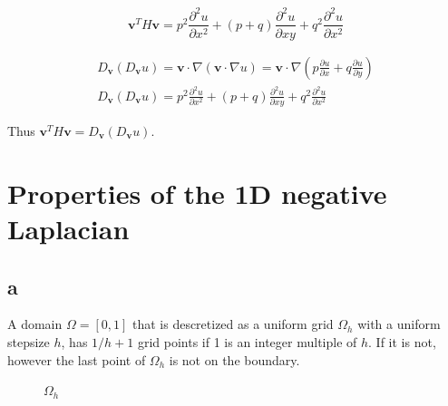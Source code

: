 \documentclass{article}
\begin{document}
\begin{equation*}
\mathbf{v}^{T} H \mathbf{v}= p^2\frac{\partial^2 u}{\partial x^2}+(p+q)\frac{\partial^2 u}{\partial xy} +q^2\frac{\partial^2 u}{\partial x^2}
\end{equation*}

\begin{align*}
D_{\mathbf{v}}\left(D_{\mathbf{v}} u\right)=\mathbf{v}\cdot \nabla(\mathbf{v} \cdot \nabla u)=\mathbf{v}\cdot \nabla(p\frac{\partial u}{\partial x}+q\frac{\partial u}{\partial y})\\
D_{\mathbf{v}}\left(D_{\mathbf{v}} u\right)=p^2\frac{\partial^2 u}{\partial x^2}+(p+q)\frac{\partial^2 u}{\partial xy} +q^2\frac{\partial^2 u}{\partial x^2}
\end{align*}

Thus $\mathbf{v}^{T} H \mathbf{v}=D_{\mathbf{v}}\left(D_{\mathbf{v}} u\right)$.



\newpage
\section{Properties of the 1D negative Laplacian}
\subsection{a}
A domain $\Omega=\left[0,1\right]$ that is descretized as a uniform grid $\Omega_h$ with a uniform stepsize $h$, has $1/h+1$ grid points if 1 is an integer multiple of $h$. If it is not, however the last point of $\Omega_h$ is not on the boundary.
\begin{figure}[H]
\centering
{}
\caption{$\Omega_h$}
\end{figure}
\end{document}
